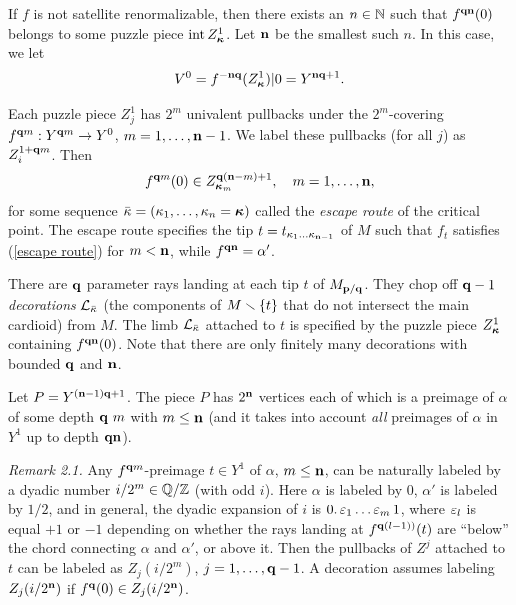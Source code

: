 \ssk
If $f$ is not satellite renormalizable, then
there exists an $n\in {\Bbb N}$ such that $f^{{\mathbf{q}}{\mathbf{n}}}(0)$ belongs
to some puzzle piece $\operatorname{int} Z_{\boldsymbol{\kappa}}^1$.
Let ${\mathbf{n}}$ be the smallest such $n$.
In this case, we let
$$
   V^0= f^{-{\mathbf{n}}{\mathbf{q}}}(Z_{\boldsymbol{\kappa}}^1)|0= Y^{{\mathbf{n}}{\mathbf{q}}+1}.
$$

Each puzzle piece $Z^1_j$ has $2^m$ univalent pullbacks under the $2^m$-covering $f^{{\mathbf{q}} m}: Y^{{\mathbf{q}} m}\rightarrow Y^0$,
$m=1,\dots, {\mathbf{n}}-1$. We label these pullbacks (for all $j$) as $Z^{1+{\mathbf{q}} m}_i$.  Then
\begin{equation}\label{escape route}
    f^{{\mathbf{q}} m}(0) \in Z^{{\mathbf{q}}({\mathbf{n}}-m)+1}_{{\boldsymbol{\kappa}}_m}, \quad m=1,\dots, {\mathbf{n}},
\end{equation}
for some sequence $\bar\kappa = (\kappa_1,\dots, \kappa_n={\boldsymbol{\kappa}})$ called the
{\it escape route} of the critical point. The escape route specifies
the tip $t=t_{\kappa_1\dots\kappa_{{\mathbf{n}}-1}}$ of $M$ such that $f_t$ satisfies
(\ref{escape route}) for $m<{\mathbf{n}}$, while $f^{{\mathbf{q}}{\mathbf{n}}}=\alpha'$.

There are ${\mathbf{q}}$ parameter rays landing at each tip $t$ of $M_{{\mathbf{p}}/{\mathbf{q}}}$.
They chop off ${\mathbf{q}}-1$ {\it decorations} ${\mathcal L}_{\bar\kappa}$
(the components of $M\smallsetminus \{t\}$ that do not intersect the main cardioid) from $M$.
The limb ${\mathcal L}_{\bar\kappa}$ attached to $t$ is specified by the puzzle piece $Z^1_{\boldsymbol{\kappa}}$ containing $f^{{\mathbf{q}}{\mathbf{n}}}(0)$.
Note that there are only finitely many decorations with bounded ${\mathbf{q}}$ and ${\mathbf{n}}$.

Let $P=Y^{({\mathbf{n}}-1){\mathbf{q}}+1}$. The piece $P$ has $2^{\mathbf{n}}$ vertices each of which is a preimage of $\alpha$
of some depth ${\mathbf{q}}\ m$ with $m\leq {\mathbf{n}}$ (and it takes into account {\it all} preimages of $\alpha$ in $Y^1$
 up to depth  ${\mathbf{q}}{\mathbf{n}}$).

\ssk
{\it Remark 2.1.}  Any $f^{{\mathbf{q}} m}$-preimage  $t\in Y^1$ of $\alpha$, $m\leq {\mathbf{n}}$,
   can be naturally labeled by a dyadic number
  $i/ 2^m\in {\Bbb Q}/{\Bbb Z}$ (with odd $i$). Here $\alpha$ is labeled by $0$, $\alpha'$ is labeled by $1/2$,
  and in general, the dyadic expansion of $i$ is  $0.\,{\varepsilon}_1\dots{\varepsilon}_m\, 1$,
  where ${\varepsilon}_l$ is equal $+1$ or $-1$ depending on whether the rays landing at $f^{{\mathbf{q}}(l-1))}(t)$
  are ``below'' the chord connecting $\alpha$ and $\alpha'$, or above it.%
 Then the pullbacks of $Z^j$ attached to $t$ can be labeled as $Z_j(i/ 2^m)$, $j=1,\dots, {\mathbf{q}}-1$.
  A decoration assumes labeling $Z_j(i / 2^{\mathbf{n}}) $ if $f^{\mathbf{q}}(0)\in Z_j(i/2^{\mathbf{n}})$.


